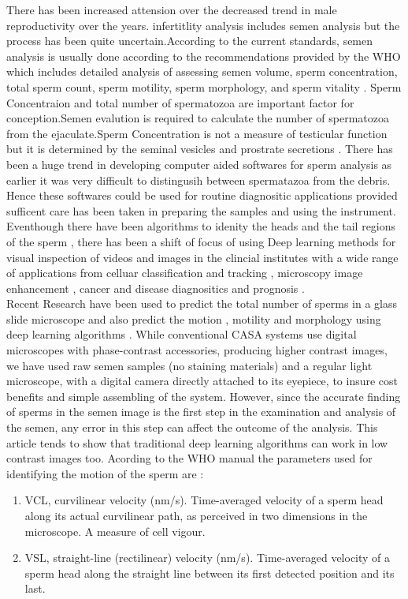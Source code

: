 \documentclass{article}
\begin{document}
There has been increased attension over the decreased trend in male reproductivity over the years\citep{10.2307/29716905}.
infertitlity analysis includes semen analysis but the process has been quite uncertain.According to the current standards, 
semen analysis is usually done according to the recommendations provided by the WHO which includes detailed analysis of assessing semen volume, sperm concentration, total sperm count, sperm motility, sperm morphology, and sperm vitality \citep*{WHO_manual}.
Sperm Concentraion and total number of spermatozoa are important factor for conception.Semen evalution is required to calculate the number of spermatozoa from the 
ejaculate.Sperm Concentration is not a measure of testicular function but it is determined by the seminal vesicles and prostrate secretions \citep{PRYOR1981571}.
There has been a huge trend in developing computer aided softwares for sperm analysis as earlier it was very difficult to distingusih between spermatazoa from the debris.
Hence these softwares could be used for routine diagnositic applications provided sufficent care has been taken in preparing the samples and using the instrument.
Eventhough there have been algorithms to idenity the heads and the tail regions of the sperm \citep{5584613} , there has been a shift of focus of using Deep learning methods for visual inspection of videos and images in the 
clincial institutes with a  wide range of applications from celluar classification and tracking \citep{Sullivan1038nbt-ta}, microscopy image enhancement ,
cancer and disease diagnositics and prognosis \citep{PavillonE2676} \citep{Im2018-vi}. \\
Recent Research have been used to predict the total number of sperms in a glass slide microscope and also predict the 
motion , motility and morphology using deep learning algorithms \citep{HIDAYATULLAH2021106302} \citep{McCallum2019-mu} \citep{RIORDON2019103342} \citep{mohammadi2020sperm}. 
While conventional CASA systems use digital microscopes with phase-contrast accessories, producing higher contrast images, we have used raw semen samples (no staining materials) and a regular 
light microscope, with a digital camera directly attached to its eyepiece, to insure cost benefits and 
simple assembling of the system. However, since the accurate finding of sperms in the semen image is the 
first step in the examination and analysis of the semen, any error in this step can affect the outcome of the analysis.
 This article tends to show that traditional deep learning algorithms can work in  low contrast images too. 
Acording to the WHO manual the parameters used for identifying the motion of the sperm are :
\begin{enumerate}
\item VCL, curvilinear velocity (nm/s). Time-averaged velocity of a sperm head along its actual curvilinear path, as 
perceived in two dimensions in the microscope. A measure of cell vigour.
\item VSL, straight-line (rectilinear) velocity (nm/s). 
Time-averaged velocity of a sperm head along the straight line between its first detected position and its last.
\end{enumerate}
\end{document}
